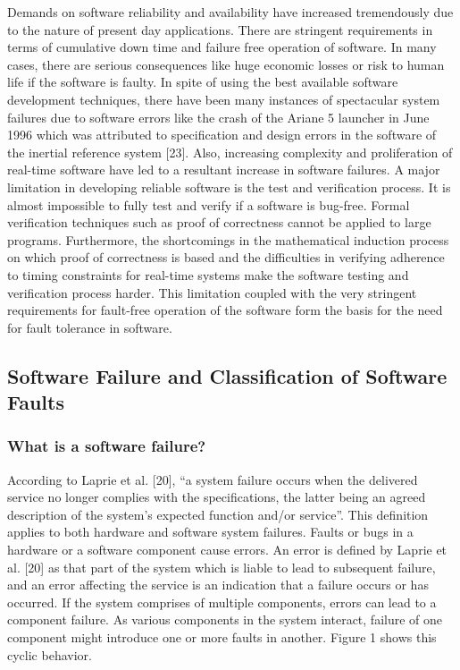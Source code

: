 \documentclass[a4paper, 11pt]{article}
\begin{document}
Demands on software reliability and availability have increased tremendously due to the nature of present day applications. There are stringent requirements in terms of cumulative down time and failure free operation of software. In many cases, there are serious consequences like huge economic losses or risk to human life if the software is faulty. In spite of using the best available software development techniques, there have been many instances of spectacular system failures due to software errors like the crash of the Ariane 5 launcher in June 1996 which was attributed to specification and design errors in the software of the inertial reference system [23]. Also, increasing complexity and proliferation of real-time software have led to a resultant increase in software failures. A major limitation in developing reliable software is the test and verification process. It is almost impossible to fully test and verify if a software is bug-free. Formal verification techniques such as proof of correctness cannot be applied to large programs. Furthermore, the shortcomings in the mathematical induction process on which proof of correctness is based and the difficulties in verifying adherence to timing constraints for real-time systems make the software testing and verification process harder. This limitation coupled with the very stringent requirements for fault-free operation of the software form the basis for the need for fault tolerance in software.

\subsection{Software Failure and Classification of Software Faults}
\subsubsection{What is a software failure?}
According to Laprie et al. [20], ``a system failure occurs when the delivered service no longer complies with the specifications, the latter being an agreed description of the system's expected function and/or service''. This definition applies to both hardware and software system failures. Faults or bugs in a hardware or a software component cause errors. An error is defined by Laprie et al. [20] as that part of the system which is liable to lead to subsequent failure, and an error affecting the service is an indication that a failure occurs or has occurred. If the system comprises of multiple components, errors can lead to a component failure. As various components in the system interact, failure of one component might introduce one or more faults in another. Figure 1 shows this cyclic behavior.
\end{document}
